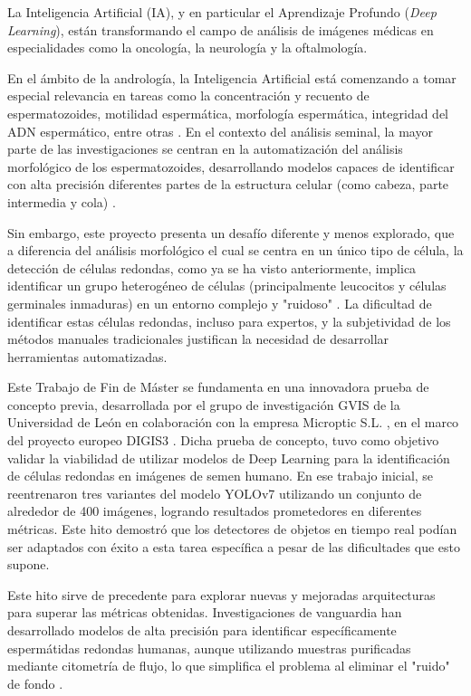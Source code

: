 \documentclass[12pt,a4paper,onecolumn,oneside]{report}
\begin{document}
La Inteligencia Artificial (IA), y en particular el Aprendizaje Profundo (\textit{Deep Learning}), están transformando el campo de análisis de imágenes médicas en especialidades como la oncología, la neurología y la oftalmología.

En el ámbito de la andrología, la Inteligencia Artificial está comenzando a tomar especial relevancia en tareas como la concentración y recuento de espermatozoides, motilidad espermática, morfología espermática, integridad del ADN espermático, entre otras \cite{PannerSelvam}. En el contexto del análisis seminal, la mayor parte de las investigaciones se centran
en la automatización del análisis morfológico de los espermatozoides, desarrollando modelos capaces de identificar con alta precisión diferentes partes de la estructura celular (como cabeza, parte intermedia y cola) \cite{Maalej2025}.

Sin embargo, este proyecto presenta un desafío diferente y menos explorado, que a diferencia del análisis morfológico el cual se centra en un único tipo de célula,
la detección de células redondas, como ya se ha visto anteriormente, implica identificar un grupo heterogéneo de células (principalmente leucocitos y células germinales inmaduras) en un entorno complejo y "ruidoso" \cite{OMS}\cite{BJBS}.
La dificultad de identificar estas células redondas, incluso para expertos, y la subjetividad de los métodos manuales tradicionales \cite{Johanisson2000} justifican la necesidad de desarrollar herramientas automatizadas.

Este Trabajo de Fin de Máster se fundamenta en una innovadora prueba de concepto previa, desarrollada por el grupo de investigación GVIS de la Universidad de León en colaboración con la empresa Microptic S.L. \cite{microptic}, en el marco del proyecto europeo DIGIS3 \cite{digis3}. 
Dicha prueba de concepto, tuvo como objetivo validar la viabilidad de utilizar modelos de Deep Learning para la identificación de células redondas en imágenes de semen humano. En ese trabajo inicial, se reentrenaron tres variantes del modelo YOLOv7 utilizando un conjunto de 
alrededor de 400 imágenes, logrando resultados prometedores en diferentes métricas. Este hito demostró que los detectores de objetos en tiempo real podían ser adaptados con éxito a esta tarea específica a pesar de las dificultades que esto supone.

Este hito sirve de precedente para explorar nuevas y mejoradas arquitecturas para superar las métricas obtenidas. Investigaciones de vanguardia han desarrollado modelos de alta precisión para identificar específicamente espermátidas redondas humanas, 
aunque utilizando muestras purificadas mediante citometría de flujo, lo que simplifica el problema al eliminar el "ruido" de fondo \cite{roundsCellsSpermatid}.
\end{document}
